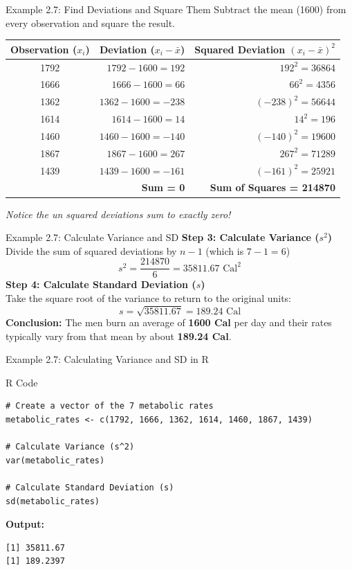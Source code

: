 \documentclass[aspectratio=169]{beamer}
\begin{document}
\begin{frame}{Example 2.7: Find Deviations and Square Them}
Subtract the mean (1600) from every observation and square the result.
\vspace{0.2cm}
\begin{table}
\centering
\scriptsize
\begin{tabular}{crr}
\toprule
\textbf{Observation ($x_i$)} & \textbf{Deviation ($x_i - \bar{x}$)} & \textbf{Squared Deviation $(x_i - \bar{x})^2$} \\
\midrule
1792 & $1792 - 1600 = 192$ & $192^2 = 36864$ \\
1666 & $1666 - 1600 = 66$ & $66^2 = 4356$ \\
1362 & $1362 - 1600 = -238$ & $(-238)^2 = 56644$ \\
1614 & $1614 - 1600 = 14$ & $14^2 = 196$ \\
1460 & $1460 - 1600 = -140$ & $(-140)^2 = 19600$ \\
1867 & $1867 - 1600 = 267$ & $267^2 = 71289$ \\
1439 & $1439 - 1600 = -161$ & $(-161)^2 = 25921$ \\
\midrule
& \textbf{Sum = 0} & \textbf{Sum of Squares = 214870} \\
\bottomrule
\end{tabular}
\end{table}
\vspace{0.1cm}
\emph{Notice the un squared deviations sum to exactly zero!}
\end{frame}

\begin{frame}{Example 2.7: Calculate Variance and SD}
\textbf{Step 3: Calculate Variance ($s^2$)} \\
Divide the sum of squared deviations by $n - 1$ (which is $7 - 1 = 6$)
$$ s^2 = \frac{214870}{6} = 35811.67 \text{ Cal}^2 $$
\vspace{0.3cm}
\textbf{Step 4: Calculate Standard Deviation ($s$)} \\
Take the square root of the variance to return to the original units:
$$ s = \sqrt{35811.67} = 189.24 \text{ Cal} $$
\vspace{0.3cm}
\textbf{Conclusion:} The men burn an average of \textbf{1600 Cal} per day and their rates typically vary from that mean by about \textbf{189.24 Cal}.
\end{frame}

\begin{frame}[fragile]{Example 2.7: Calculating Variance and SD in R}
\begin{block}{R Code}
\begin{verbatim}
# Create a vector of the 7 metabolic rates
metabolic_rates <- c(1792, 1666, 1362, 1614, 1460, 1867, 1439)

# Calculate Variance (s^2)
var(metabolic_rates)

# Calculate Standard Deviation (s)
sd(metabolic_rates)
\end{verbatim}
\end{block}
\textbf{Output:}
\begin{verbatim}
[1] 35811.67
[1] 189.2397
\end{verbatim}
\end{frame}
\end{document}
